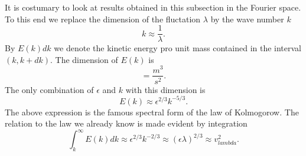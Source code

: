 It is costumary to look at results obtained in this subsection in the Fourier
space. To this end we replace the dimension of the fluctation $\lambda$ by the
wave number $k$ 
\begin{displaymath}
  k \approx \frac{1}{\lambda}.
\end{displaymath}
By $E(k)dk$ we denote the kinetic energy pro unit mass contained in 
the interval $(k,k+dk)$. The dimension of $E(k)$ is
\begin{displaymath}
  [E(k)] = \frac{m^3}{s^2}.
\end{displaymath}
The only combination of $\epsilon$ and $k$ with this dimension is
\begin{displaymath}
  E(k) \approx \epsilon^{2/3}k^{-5/3}.
\end{displaymath}
The above expression is the famous spectral form of the law of Kolmogorow. 
The relation to the law we already know is made evident by integration
\begin{displaymath}
  \int_k^{\infty} E(k)dk \approx \epsilon^{2/3}k^{-2/3} 
    \approx (\epsilon \lambda)^{2/3} \approx v_{lambda}^2.
\end{displaymath}

